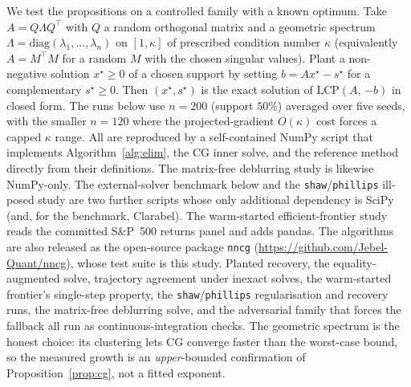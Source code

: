 We test the propositions on a controlled family with a known optimum. Take
$A = Q\Lambda Q^\top$ with $Q$ a random orthogonal matrix and a geometric spectrum
$\Lambda = \mathrm{diag}(\lambda_1,\dots,\lambda_n)$ on $[1,\kappa]$ of prescribed condition
number $\kappa$ (equivalently $A = M^\top M$ for a random $M$ with the chosen singular values).
Plant a non-negative solution $x^\star \geq 0$ of a chosen support by setting
$b = A x^\star - s^\star$ for a complementary $s^\star \geq 0$. Then $(x^\star, s^\star)$ is
the exact solution of $\mathrm{LCP}(A,\,{-b})$ in closed form. The runs below use $n=200$
(support $50\%$) averaged over five seeds, with the smaller $n=120$ where the projected-gradient
$O(\kappa)$ cost forces a capped $\kappa$ range. All are reproduced by a self-contained
NumPy script that implements Algorithm~\ref{alg:elim}, the CG inner solve, and the reference
method directly from their definitions. The matrix-free deblurring study is likewise
NumPy-only. The external-solver benchmark below and the \texttt{shaw}/\texttt{phillips}
ill-posed study are two further scripts whose only additional dependency is SciPy (and, for the
benchmark, Clarabel). The warm-started efficient-frontier study reads the committed S\&P~500
returns panel and adds pandas. The algorithms are also released as the
open-source package \texttt{nncg} (\url{https://github.com/Jebel-Quant/nncg}), whose test
suite is this study. Planted recovery, the equality-augmented solve, trajectory agreement
under inexact solves, the warm-started frontier's single-step property, the
\texttt{shaw}/\texttt{phillips} regularisation and recovery runs, the matrix-free deblurring
solve, and the adversarial family that forces the fallback all run as continuous-integration
checks. The geometric spectrum is
the honest choice: its clustering lets CG converge faster than the worst-case bound, so the
measured growth is an \emph{upper}-bounded confirmation of Proposition~\ref{prop:cg}, not a
fitted exponent.

\begin{table}[ht]
\centering
\footnotesize

\caption{Active-set solve of~\eqref{eq:bqp} on the synthetic family ($n=200$, support $50\%$,
mean over five seeds). Outer steps stay in single digits, and the total CG inner count grows
sublinearly in $\kappa$ (slope $\nncgCGslope$ in $\log$--$\log$, $R^2 = \nncgCGrtwo$, against
the $O(\sqrt\kappa)$ worst case). The Bland fallback is never triggered here, so the fast
block-pivot path certifies optimality alone. The solver recovers the planted $x^\star$ to
$\nncgMaxErr$.}
\label{tab:nncg_synthetic}
\end{table}


